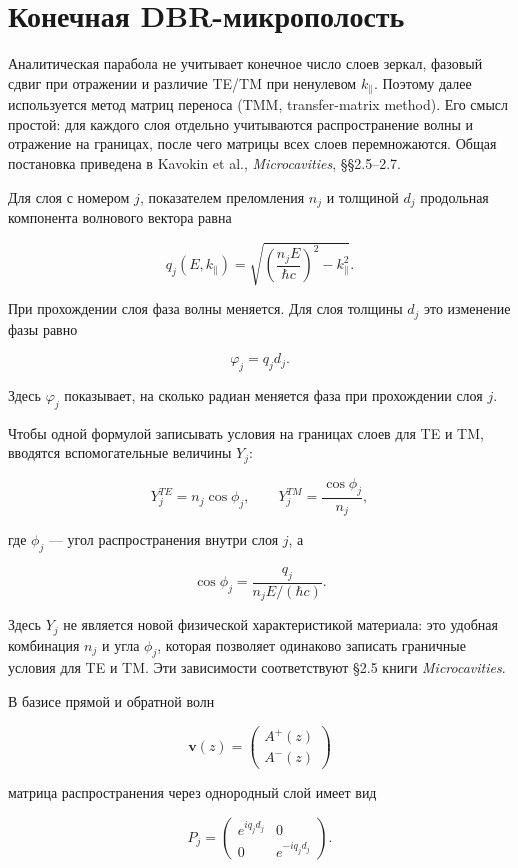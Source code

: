 \documentclass[12pt,a4paper]{article}
\begin{document}
\clearpage
\section{Конечная DBR-микрополость}

Аналитическая парабола не учитывает конечное число слоев зеркал, фазовый сдвиг при отражении и различие TE/TM при ненулевом $k_\parallel$. Поэтому далее используется метод матриц переноса (TMM, transfer-matrix method). Его смысл простой: для каждого слоя отдельно учитываются распространение волны и отражение на границах, после чего матрицы всех слоев перемножаются. Общая постановка приведена в Kavokin et al., \textit{Microcavities}, §§2.5--2.7.

Для слоя с номером $j$, показателем преломления $n_j$ и толщиной $d_j$ продольная компонента волнового вектора равна

\[
q_j(E,k_\parallel)
=
\sqrt{
\left(\frac{n_jE}{\hbar c}\right)^2-k_\parallel^2
}.
\]

При прохождении слоя фаза волны меняется. Для слоя толщины $d_j$ это изменение фазы равно

\[
\varphi_j=q_jd_j.
\]

Здесь $\varphi_j$ показывает, на сколько радиан меняется фаза при прохождении слоя $j$.

Чтобы одной формулой записывать условия на границах слоев для TE и TM, вводятся вспомогательные величины $Y_j$:

\[
Y_j^{TE}=n_j\cos\phi_j,
\qquad
Y_j^{TM}=\frac{\cos\phi_j}{n_j},
\]

где $\phi_j$ --- угол распространения внутри слоя $j$, а

\[
\cos\phi_j=
\frac{q_j}{n_jE/(\hbar c)}.
\]

Здесь $Y_j$ не является новой физической характеристикой материала: это удобная комбинация $n_j$ и угла $\phi_j$, которая позволяет одинаково записать граничные условия для TE и TM. Эти зависимости соответствуют §2.5 книги \textit{Microcavities}.

В базисе прямой и обратной волн

\[
\mathbf v(z)=
\begin{pmatrix}
A^+(z)\\A^-(z)
\end{pmatrix}
\]

матрица распространения через однородный слой имеет вид

\[
P_j=
\begin{pmatrix}
e^{iq_jd_j} & 0\\
0 & e^{-iq_jd_j}
\end{pmatrix}.
\]
\end{document}
